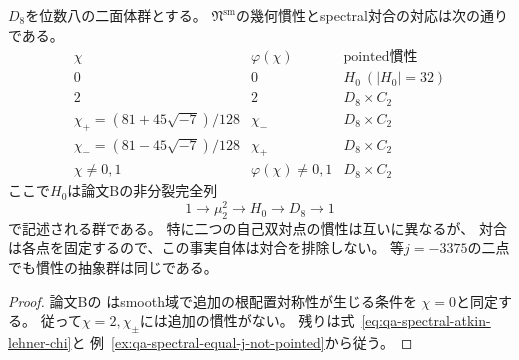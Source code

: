 \begin{proposition}
\label{prop:qa-spectral-geometric-inertia-comparison}
$D_8$を位数八の二面体群とする。
$\mathfrak N^{\mathrm{sm}}$の幾何慣性とspectral対合の対応は次の通りである。
\[
\begin{array}{c|c|c}
\chi&\varphi(\chi)&\text{pointed慣性}\\\hline
0&0&H_0\ (|H_0|=32)\\
2&2&D_8\times C_2\\
\chi_+=(81+45\sqrt{-7})/128&\chi_-&D_8\times C_2\\
\chi_-=(81-45\sqrt{-7})/128&\chi_+&D_8\times C_2\\
\chi\ne0,1&\varphi(\chi)\ne0,1&D_8\times C_2
\end{array}
\]
ここで$H_0$は論文Bの非分裂完全列
\[
1\longrightarrow\mu_2^2\longrightarrow H_0
\longrightarrow D_8\longrightarrow1
\]
で記述される群である。
特に二つの自己双対点の慣性は互いに異なるが、
対合は各点を固定するので、この事実自体は対合を排除しない。
等$j=-3375$の二点でも慣性の抽象群は同じである。
\end{proposition}
\begin{proof}
論文Bの\cite[\texttt{prop:noncubic-all-stabilizers}]{QuadricModuli2026}
はsmooth域で追加の根配置対称性が生じる条件を
$\chi=0$と同定する。
従って$\chi=2,\chi_\pm$には追加の慣性がない。
残りは式~\eqref{eq:qa-spectral-atkin-lehner-chi}と
例~\ref{ex:qa-spectral-equal-j-not-pointed}から従う。
\end{proof}

